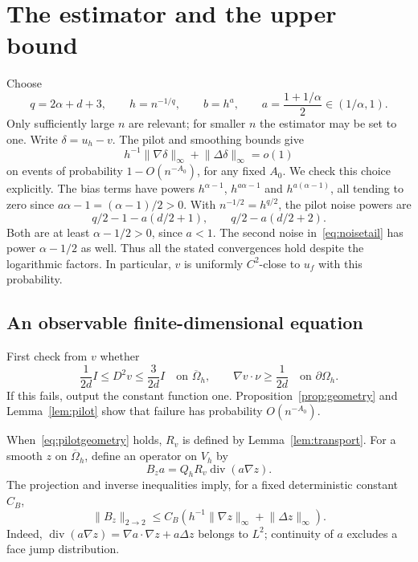 \documentclass[11pt]{article}
\theoremstyle{remark}
\newcommand{\diver}{\operatorname{div}}
\newcommand{\norm}[1]{\lVert #1\rVert}
\begin{document}
\section{The estimator and the upper bound}\label{sec:upper}
Choose
\begin{equation}\label{eq:bandwidths}
 q=2\alpha+d+3,\qquad h=n^{-1/q},\qquad
 b=h^a,\qquad a=\frac{1+1/\alpha}{2}\in(1/\alpha,1).
\end{equation}
Only sufficiently large $n$ are relevant; for smaller $n$ the estimator may be set to one. Write $\delta=u_h-v$. The pilot and smoothing bounds give
\begin{equation}\label{eq:deltasmall}
 h^{-1}\norm{\nabla\delta}_\infty+\norm{\Delta\delta}_\infty=o(1)
\end{equation}
on events of probability $1-O(n^{-A_0})$, for any fixed $A_0$. We check this choice explicitly. The bias terms have powers $h^{\alpha-1}$, $h^{a\alpha-1}$ and $h^{a(\alpha-1)}$, all tending to zero since $a\alpha-1=(\alpha-1)/2>0$. With $n^{-1/2}=h^{q/2}$, the pilot noise powers are
\[
 q/2-1-a(d/2+1),\qquad q/2-a(d/2+2).
\]
Both are at least $\alpha-1/2>0$, since $a<1$. The second noise in~\eqref{eq:noisetail} has power $\alpha-1/2$ as well. Thus all the stated convergences hold despite the logarithmic factors. In particular, $v$ is uniformly $C^2$-close to $u_f$ with this probability.

\subsection{An observable finite-dimensional equation}
First check from $v$ whether
\begin{equation}\label{eq:pilotgeometry}
 \frac1{2d}I\le D^2v\le\frac3{2d}I\quad\text{on }\overline\Omega_h,
 \qquad \nabla v\cdot\nu\ge\frac1{2d}\quad\text{on }\partial\Omega_h.
\end{equation}
If this fails, output the constant function one. Proposition~\ref{prop:geometry} and Lemma~\ref{lem:pilot} show that failure has probability $O(n^{-A_0})$.

When~\eqref{eq:pilotgeometry} holds, $R_v$ is defined by Lemma~\ref{lem:transport}. For a smooth $z$ on $\overline\Omega_h$, define an operator on $V_h$ by
\begin{equation}\label{eq:B}
 B_z a=Q_hR_v\diver(a\nabla z).
\end{equation}
The projection and inverse inequalities imply, for a fixed deterministic constant $C_B$,
\begin{equation}\label{eq:Bbound}
 \norm{B_z}_{2\to2}
 \le C_B\left(h^{-1}\norm{\nabla z}_\infty+\norm{\Delta z}_\infty\right).
\end{equation}
Indeed, $\diver(a\nabla z)=\nabla a\cdot\nabla z+a\Delta z$ belongs to $L^2$; continuity of $a$ excludes a face jump distribution. 
\end{document}
